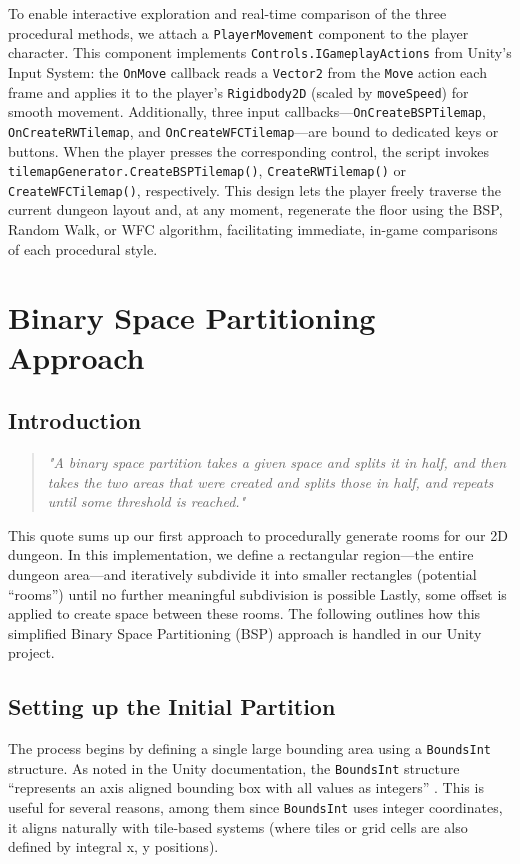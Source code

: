 \documentclass[a4paper, 12pt, one column, aas_macros]{article}
\begin{document}
To enable interactive exploration and real-time comparison of the three procedural methods, we attach a \texttt{PlayerMovement} component to the player character. This component implements \texttt{Controls.IGameplayActions} from Unity's Input System: the \texttt{OnMove} callback reads a \texttt{Vector2} from the \texttt{Move} action each frame and applies it to the player's \texttt{Rigidbody2D} (scaled by \texttt{moveSpeed}) for smooth movement. Additionally, three input callbacks---\texttt{OnCreateBSPTilemap}, \texttt{OnCreateRWTilemap}, and \texttt{OnCreateWFCTilemap}---are bound to dedicated keys or buttons. When the player presses the corresponding control, the script invokes \texttt{tilemapGenerator.CreateBSPTilemap()}, \texttt{CreateRWTilemap()} or \texttt{CreateWFCTilemap()}, respectively. This design lets the player freely traverse the current dungeon layout and, at any moment, regenerate the floor using the BSP, Random Walk, or WFC algorithm, facilitating immediate, in-game comparisons of each procedural style.

\section{Binary Space Partitioning Approach}
\subsection{Introduction}
\begin{quote}
  \emph{"A binary space partition takes a given space and splits it in half, and then takes the two areas that were created and splits those in half, and repeats until some threshold is reached."}
  \cite[p.~293]{ShortAdams2017}
\end{quote}

This quote sums up our first approach to procedurally generate rooms for our 2D dungeon. In this implementation, we define a rectangular region---the entire dungeon area---and iteratively subdivide it into smaller rectangles (potential ``rooms'') until no further meaningful subdivision is possible Lastly, some offset is applied to create space between these rooms. The following outlines how this simplified Binary Space Partitioning (BSP) approach is handled in our Unity project.

\subsection{Setting up the Initial Partition}
The process begins by defining a single large bounding area using a \texttt{BoundsInt} structure. As noted in the Unity documentation, the \texttt{BoundsInt} structure ``represents an axis aligned bounding box with all values as integers'' \citep{unity_docs}. This is useful for several reasons, among them since \texttt{BoundsInt} uses integer coordinates, it aligns naturally with tile-based systems (where tiles or grid cells are also defined by integral x, y positions).
\end{document}
